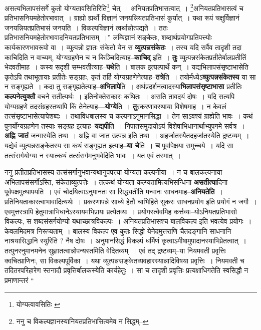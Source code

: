 \documentclass[article,12pt,a4paper]{memoir}
\begin{document}
	असत्यभिलापसंसर्गे कुतो योग्यतावसितिरिति\footnote{योग्यत्वावसितिः \cite{dp-msC} \cite{dp-msD} \cite{dp-msB}} चेत् । अनियतप्रतिभासत्वात् । \footnote{ननु च विकल्पज्ञानस्यानियतप्रतिभासित्वमेव न सिद्धम्--\cite{dp-msD-n}}\-अनियतप्रतिभासत्वं च प्रतिभासनियमहेतोरभावात् । ग्राह्यो ह्यर्थो विज्ञानं जनयन्नियतप्रतिभासं कुर्यात् । यथा रूपं चक्षुर्विज्ञानं जनयन्नियतप्रतिभासं जनयति । विकल्पविज्ञानं त्वर्थान्नोत्पद्यते । ततः प्रतिभासनियमहेतोरभावादनियतप्रतिभासम् ।” लम्बिज्ञानं सङ्केतः, शब्दार्थप्रयोगप्रतिपत्त्योः कार्यकारणभावरूपो वा । व्युत्पन्नो ज्ञातः संकेतो येन स \textbf{व्युत्पन्नसंकेतः} । तस्य यदि सर्वैव तादृशी तदा काचिदिति न वाच्यम्, योग्यग्रहणेन च न किञ्चिदित्याह--\textbf{काचिद्} इति । \textbf{तुः} व्युत्पन्नसंकेतप्रतीतेर्बालप्रतीतिं भेदवतीमाह । कस्य सदृशी सम्भवतीत्याह--\textbf{यथे}ति । बालक इत्यल्पार्थे कन् । यद्यभिलापसंसृष्टाभासेति कृतेऽपि तथाभूतायाः प्रतीतेः सङ्ग्रहः, कृतं तर्हि योग्यग्रहणेनेत्याह--\textbf{तत्रे}ति । तयोर्मध्येऽ\textbf{व्युत्पन्नसंकेतस्य} या सा न सङ्गृह्यते । कदा तु सङ्गृह्यतेत्याह--\textbf{अभिलापे}ति । अर्थप्रदर्शनत्वादस्या\textbf{भिलापसंसृष्टाभासा} प्रतीतिः \textbf{कल्पनेत्युक्तौ} वचने सतीत्यर्थः । इतिनोक्तेराकारः कथितः । असति तावदयं दोषः । यदि सत्यपि योग्यग्रहणे तदसंग्रहस्तथापि किं तेनेत्याह—\textbf{योग्ये}ति । \textbf{तु}रकरणावस्थाया विशेषमाह । न केवलं तत्संसृष्टाभासेत्यापेशब्दः । तथाविधबालस्य च कल्पनाऽनुमानसिद्धा । तेन साऽवश्यं ग्राह्येति भावः । कथं पुनर्योग्यग्रहणेन तस्याः सङ्ग्रह इत्याह--\textbf{यद्यपी}ति । निपातसमुदायोऽयं विशेषाभिधानार्थाभ्युपगमे सर्वत्र । \textbf{अह्नि जातं} जन्मास्येति तथा । अह्नि वा जात उत्पन्न इति तथा । अहर्जातस्यैतदहर्जातस्येति द्रष्टव्यम् । यद्येवं व्युत्पन्नसङ्केतस्य सा कथं सङ्गृह्यत इत्याह--\textbf{या चे}ति । \textbf{च} पूर्वापेक्षया समुच्चये । यदि सा तत्संसर्गयोग्या न स्यात्कथं तत्संसर्गमनुभवेदिति भावः । यत एवं तस्मात् ।
	\pend
      

	  \pstart ननु प्रतीतप्रतिभासस्य तत्संसर्गानुभवान्यथानुपपत्त्या योग्यता कल्पनीया । न च बालकल्पनाया अभिलापसंसर्गोऽस्ति, संकेताव्युत्पत्तेः । तत्कथं योग्यता कल्प्यतामित्यभिसन्धिना \textbf{असतीत्या}दिना पूर्वपक्षमुत्थापयति । एवं चोदयित्वाऽनुमानतः सा सिद्ध्यतीति मन्वानः साधनमाह--\textbf{अनियतेति} । प्रतिनियताकारत्वाभावादित्यर्थः । प्रकरणापन्ने साध्ये हेतौ चाभिहिते सुकरः साधनप्रयोग इति प्रयोगं न जगौ । एवमुत्तरत्रापि हेतुमात्राभिधानेऽस्यायमभिप्रायः प्रत्येतव्यः । प्रयोगस्त्वेवमिह कर्त्तव्यः--योऽनियतप्रतिभासो विकल्पः, स शब्दसंसर्गयोग्यो यथाच्छात्रविकल्पः । अनियतप्रतिभासश्च बालविकल्प इति भवत्येव प्रयोगः । केवलमिदमत्र निरूप्यताम् । बालस्य विकल्प एव कुतः सिद्धो येनेदमुत्तराणि चैतदङ्गानि साधनानि ना\leavevmode{}श्रयासिद्धानि स्युरिति ? नैष दोषः । अनुमानसिद्धं विकल्पं धर्मिणं कृत्वाऽमीषामुपादानस्याभिप्रेतत्वात् । तत्पुनरनुमानमनेन सुज्ञातत्वान्नोपन्यस्तमिति वेदितव्यम् । एवं तद् द्रष्टव्यम्--या नियमवती प्रवृत्तिः क्वचित्प्राणिनः, सा विकल्पपूर्विका । यथा व्युत्पन्नसङ्केतव्यवहारस्यान्नादिविषया प्रवृत्तिः । नियमवती च तदितरपरिहारेण स्तनादौ प्रवृत्तिर्बालकस्येति कार्यहेतुः । सा च तादृशी प्रवृत्तिः प्रत्यक्षाधिगतेति स्वसिद्धौ न प्रमाणान्तरं  \leavevmode{} “
	  
\end{document}
